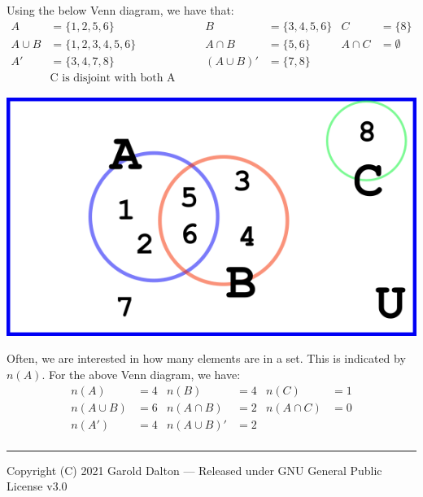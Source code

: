 \documentclass[14pt]{extarticle}
\begin{document}
Using the below Venn diagram, we have that:
\begin{align*}
	A &= \{1,2,5,6\} &  B&= \{3,4,5,6\}  & C &= \{8\}\\
	A \cup B &= \{1,2,3,4,5,6\} & A \cap B&= \{5,6\} & A \cap C &= \emptyset\\
	A' &= \{3,4,7,8\} & (A\cup B)' &= \{7,8\} & & \\
	&\text{C is disjoint with both A and B}
\end{align*}
\begin{center}
	\includegraphics[width=0.5\linewidth]{venn-2}
\end{center}
Often, we are interested in how many elements are in a set. This is indicated by $n(A)$. For the above Venn diagram, we have:
\begin{align*}
	n(A) &= 4  & n(B)&= 4  & n(C) &= 1 \\
	n(A \cup B) &= 6 & n(A \cap B)&= 2 &n( A \cap C) &= 0 \\
	n(A') &= 4 & n(A\cup B)' &= 2 & & \\
\end{align*}

\noindent\rule{\textwidth}{1pt}
{\footnotesize Copyright (C) 2021 Garold Dalton --- Released under GNU General Public License v3.0}


\cleardoublepage
\end{document}
